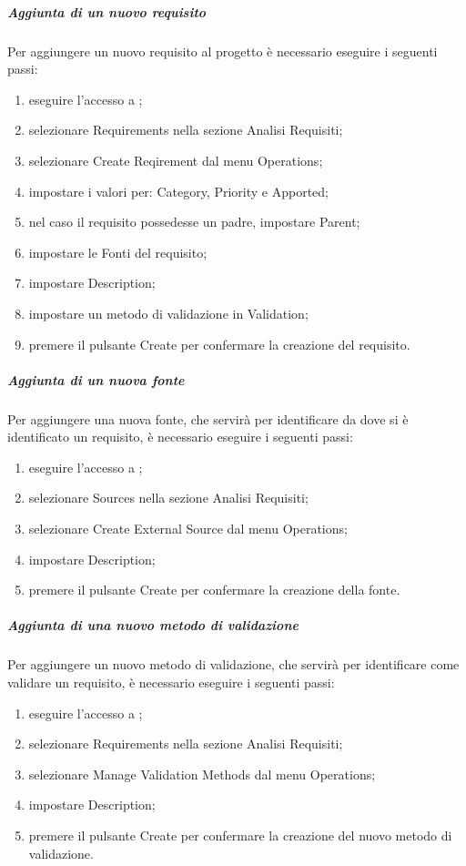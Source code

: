 \documentclass[12pt,a4paper]{article}
\begin{document}
\subparagraph{Aggiunta di un nuovo requisito}
Per aggiungere un nuovo requisito al progetto è necessario eseguire i seguenti passi:
\begin{enumerate}
	\item eseguire l'accesso a ;
	\item selezionare Requirements nella sezione Analisi Requisiti;
	\item selezionare Create Reqirement dal menu Operations;
	\item impostare i valori per: Category, Priority e Apported;
	\item nel caso il requisito possedesse un padre, impostare Parent;
	\item impostare le Fonti del requisito;
	\item impostare Description; 
	\item impostare un metodo di validazione in Validation;
	\item premere il pulsante Create per confermare la creazione del requisito.
\end{enumerate}

\subparagraph{Aggiunta di un nuova fonte}
Per aggiungere una nuova fonte, che servirà per identificare da dove si è identificato un requisito, è necessario eseguire i seguenti passi: 
\begin{enumerate}
	\item eseguire l'accesso a ;
	\item selezionare Sources nella sezione Analisi Requisiti;
	\item selezionare Create External Source dal menu Operations;
	\item impostare Description; 
	\item premere il pulsante Create per confermare la creazione della fonte.
\end{enumerate}

\subparagraph{Aggiunta di una nuovo metodo di validazione}
Per aggiungere un nuovo metodo di validazione, che servirà per identificare come validare un requisito, è necessario eseguire i seguenti passi: 
\begin{enumerate}
	\item eseguire l'accesso a ;
	\item selezionare Requirements nella sezione Analisi Requisiti;
	\item selezionare Manage Validation Methods dal menu Operations;
	\item impostare Description; 
	\item premere il pulsante Create per confermare la creazione del nuovo metodo di validazione.
\end{enumerate}
\end{document}
